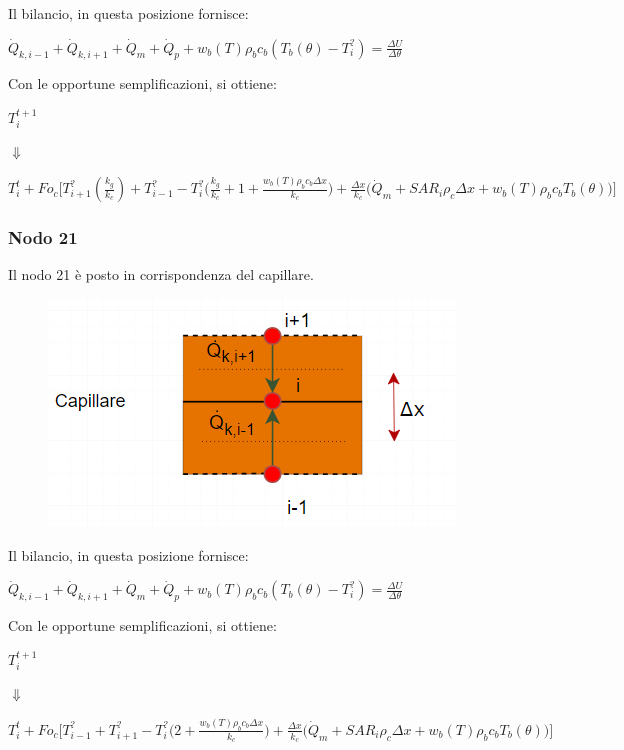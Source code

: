 Il bilancio, in questa posizione fornisce:
\begin{center}
	$ \Dot{Q} _{k, i-1} +\Dot{Q} _{k, i+1}+ \Dot{Q} _{m} +\Dot{Q} _{p}+ w_b (T) \rho _b c_b (T_b(\theta)-T_i ^?)= \frac{\Delta U}{\Delta \theta} $
\end{center}
Con le opportune semplificazioni, si ottiene:
\begin{center}
	$T_i ^{t+1} $
\end{center}
\begin{center}
	$\Downarrow$
\end{center}
\begin{center}
	$T_i ^t + Fo_{c} \Bigg[ T_{i+1} ^? (\frac{k_{g}}{k_c}) + T_{i-1} ^?- T_i ^? \Big(\frac{k_{g}}{k_c} + 1 + \frac{ w_b (T) \rho _b c_b \Delta x }{k_{c}} \Big) + \frac{\Delta x }{k_{c}} \Big(\Dot{Q} _{m} +  SAR_i \rho _{c} \Delta x + w_b (T) \rho _b c_b T_b(\theta)\Big) \Bigg]$
\end{center}


\subsubsection*{Nodo 21}
Il nodo 21 è posto in corrispondenza del capillare.\\
\begin{figure}[H]
    \centering
    \includegraphics[width=.6\textwidth]{Immagini/Nodi/nodo21.png} 
    \label{nodo17}
\end{figure}
\noindent
Il bilancio, in questa posizione fornisce:
\begin{center}
	$ \Dot{Q} _{k, i-1} +\Dot{Q} _{k, i+1}+ \Dot{Q} _{m} +\Dot{Q} _{p}+ w_b (T) \rho _b c_b (T_b(\theta)-T_i ^?)= \frac{\Delta U}{\Delta \theta} $
\end{center}
Con le opportune semplificazioni, si ottiene:
\begin{center}
	$T_i ^{t+1} $
\end{center}
\begin{center}
	$\Downarrow$
\end{center}
\begin{center}
	$T_i ^t + Fo_{c} \Bigg[ T_{i-1} ^? + T_{i+1} ^?- T_i ^? \Big(2 + \frac{ w_b (T) \rho _b c_b \Delta x }{k_{c}} \Big) + \frac{\Delta x }{k_{c}} \Big(\Dot{Q} _{m} +  SAR_i \rho _{c} \Delta x + w_b (T) \rho _b c_b T_b(\theta)\Big) \Bigg]$
\end{center}



